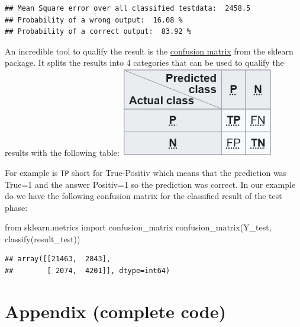 \documentclass[
]{book}
\newenvironment{Shaded}{\begin{snugshade}}{\end{snugshade}}
\newcommand{\ImportTok}[1]{#1}
\newcommand{\NormalTok}[1]{#1}
\begin{document}
\begin{verbatim}
## Mean Square error over all classified testdata:  2458.5
## Probability of a wrong output:  16.08 %
## Probability of a correct output:  83.92 %
\end{verbatim}

An incredible tool to qualify the result is the \href{https://en.wikipedia.org/wiki/Confusion_matrix}{confusion matrix} from the sklearn package. It splits the results into 4 categories that can be used to qualify the results with the following table:
\includegraphics[width=0.5\textwidth,height=\textheight]{./img/confusion_matrix.png}

For example is \texttt{TP} short for True-Positiv which means that the prediction was True=1 and the answer Positiv=1 so the prediction was correct. In our example do we have the following confusion matrix for the classified result of the test phase:

\begin{Shaded}
\begin{Highlighting}[]
\ImportTok{from}\NormalTok{ sklearn.metrics }\ImportTok{import}\NormalTok{ confusion\_matrix}
\NormalTok{confusion\_matrix(Y\_test, classify(result\_test))}
\end{Highlighting}
\end{Shaded}

\begin{verbatim}
## array([[21463,  2843],
##        [ 2074,  4201]], dtype=int64)
\end{verbatim}

\hypertarget{appendix-complete-code-3}{%
\section{Appendix (complete code)}\label{appendix-complete-code-3}}
\end{document}
